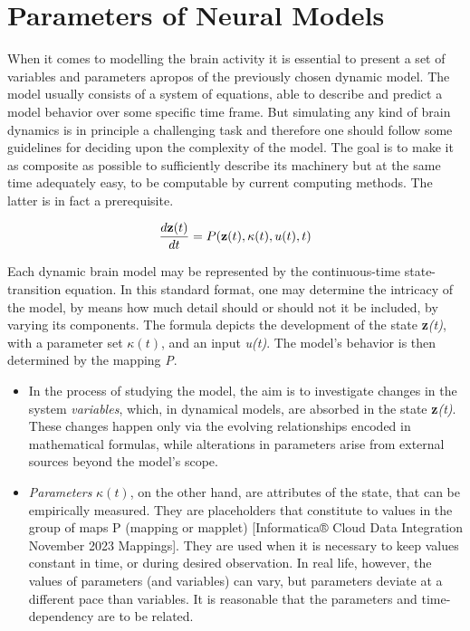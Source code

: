\documentclass[../../Orator]{subfiles}
\begin{document}
 
\section{Parameters of Neural Models}

When it comes to modelling the brain activity it is essential to present a set of variables and parameters apropos of the previously chosen dynamic model. The model usually consists of a system of equations, able to describe and predict a model behavior over some specific time frame. But simulating any kind of brain dynamics is in principle a challenging task and therefore one should follow some guidelines for deciding upon the complexity of the model. The goal is to make it as composite as possible to sufficiently describe its machinery but at the same time adequately easy, to be computable by current computing methods. The latter is in fact a prerequisite.

\begin{equation}
    \frac{d\mathbf{z}(t)}{dt} = P(\mathbf{z}(t), \kappa(t), u(t),t)
\end{equation}

Each dynamic brain model may be represented by the continuous-time state-transition equation. In this standard format, one may determine the intricacy of the model, by means how much detail should or should not it be included, by varying its components. The formula depicts the development of the state \textbf{z}\textit{(t)}, with a parameter set \(\kappa (t)\), and an input \textit{u(t)}. The model’s behavior is then determined by the mapping \textit{P}. 

\begin{itemize}
    \item In the process of studying the model, the aim is to investigate changes in the system \textit{variables}, which, in dynamical models, are absorbed in the state \textbf{z}\textit{(t)}. These changes happen only via the evolving relationships encoded in mathematical formulas, while alterations in parameters arise from external sources beyond the model's scope. 
    \item \textit{Parameters} \(\kappa (t)\), on the other hand, are attributes of the state, that can be empirically measured. They are placeholders that constitute to values in the group of maps P (mapping or mapplet) [Informatica® Cloud Data Integration November 2023 Mappings]. They are used when it is necessary to keep values constant in time, or during desired observation. In real life, however, the values of parameters (and variables) can vary, but parameters deviate at a different pace than variables. It is reasonable that the parameters and time-dependency are to be related. 
\end{itemize} 
\end{document}
